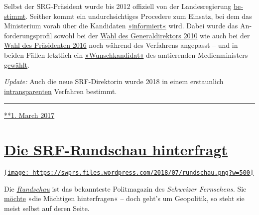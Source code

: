 Selbst der SRG-Präsi­dent wurde bis 2012 offiziell von der
Landesregierung
\href{https://web.archive.org/web/20150919041519/http://www.srgssr.ch/fileadmin/pdfs/Vereinsgeschichte_SRG.pdf}{be­stimmt}.
Seit­her kommt ein un­durch­sich­tiges Pro­ce­dere zum Ein­satz, bei dem
das Minis­terium vorab über die Kan­di­daten
\href{http://www.tagesanzeiger.ch/schweiz/standard/Neuer-SRGPraesident-verzweifelt-gesucht/story/18371394}{»infor­miert«}
wird. Dabei wurde das An­for­de­rungs­profil sowohl bei der
\href{http://www.aargauerzeitung.ch/schweiz/srg-extrawurst-fuer-roger-de-weck-8808607}{Wahl
des General­di­rektors 2010} wie auch bei der
\href{http://www.nzz.ch/nzzas/nzz-am-sonntag/favorit-fuer-das-srg-praesidium-leuthard-will-cvp-freund-an-srg-spitze-ld.90097}{Wahl
des Prä­si­denten 2016} noch während des Ver­fahrens ange­passt -- und
in beiden Fällen letzt­lich ein
\href{http://www.aargauerzeitung.ch/schweiz/war-roger-de-weck-der-lieblingskandidat-von-moritz-leuenberger-8833796}{»Wunsch­kan­di­dat«}
des am­tie­renden Medien­mi­nis­ters
\href{http://www.nzz.ch/nzzas/nzz-am-sonntag/favorit-fuer-das-srg-praesidium-leuthard-will-cvp-freund-an-srg-spitze-ld.90097}{gewählt}.

\emph{Update:} Auch die neue SRF-Direktorin wurde 2018 in einem
erstaunlich
\href{http://www.kleinreport.ch/news/geheimloge-srg-intransparenz-bei-der-besetzung-der-srf-direktion-91015/}{intransparenten}
Ver­fah­ren bestimmt.

\begin{center}\rule{0.5\linewidth}{\linethickness}\end{center}

\href{https://swprs.org/2017/03/01/srg-idee-suisse/}{**1. March 2017}

\hypertarget{die-srf-rundschau-hinterfragt}{%
\section{\texorpdfstring{\href{https://swprs.org/2017/03/01/srf-rundschau/}{Die
SRF-Rundschau
hinterfragt}}{Die SRF-Rundschau hinterfragt}}\label{die-srf-rundschau-hinterfragt}}

\href{https://swprs.org/2017/03/01/srf-rundschau/}{\texttt{[image: https://swprs.files.wordpress.com/2018/07/rundschau.png?w=500]}}

Die
\emph{\href{https://de.wikipedia.org/wiki/Rundschau_(SRF)}{Rundschau}}
ist das bekannteste Polit­ma­ga­zin des \emph{Schweizer Fernsehens.} Sie
\href{https://www.srf.ch/sendungen/rundschau/50-jahre-rundschau-die-jubilaeumssendung}{möchte}
»die Mächtigen hinterfragen« -- doch geht's um Geo­po­litik, so steht
sie meist selbst auf deren Seite.

